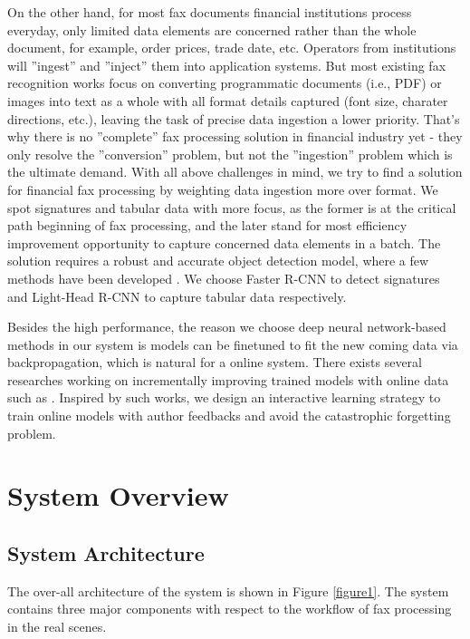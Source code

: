 \documentclass[sigconf]{acmart}
\begin{document}
On the other hand, for most fax documents financial institutions process everyday, only limited data elements are concerned rather than the whole document, for example, order prices, trade date, etc. Operators from institutions will ''ingest'' and ''inject'' them into application systems. But most existing fax recognition works focus on converting programmatic documents (i.e., PDF) or images into text as a whole with all format details captured (font size, charater directions, etc.), leaving the task of precise data ingestion a lower priority. That's why there is no ''complete'' fax processing solution in financial industry yet - they only resolve the ''conversion'' problem, but not the ''ingestion'' problem which is the ultimate demand. With all above challenges in mind, we try to find a solution for financial fax processing by weighting data ingestion more over format. We spot signatures and tabular data with more focus, as the former is at the critical path beginning of fax processing, and the later stand for most efficiency improvement opportunity to capture concerned data elements in a batch. The solution requires a robust and accurate object detection model, where a few methods have been developed \cite{ren2015faster, dai2016r, li2017light}. We choose Faster R-CNN \cite{ren2015faster} to detect signatures and Light-Head R-CNN \cite{li2017light} to capture tabular data respectively. 

Besides the high performance, the reason we choose deep neural network-based methods in our system is models can be finetuned to fit the new coming data via backpropagation, which is natural for a online system. There exists several researches working on incrementally improving trained models with online data such as \cite{shmelkov2017incremental, su2016line}. Inspired by such works, we design an interactive learning strategy to train online models with author feedbacks and avoid the catastrophic forgetting problem.

\section{System Overview}
\subsection{System Architecture}
The over-all architecture of the system is shown in Figure \ref{figure1}. The system contains three major components with respect to the workflow of fax processing in the real scenes.  
\end{document}
